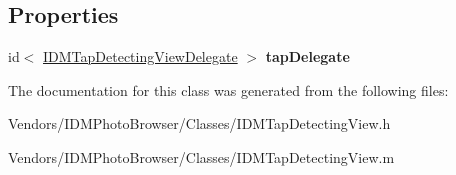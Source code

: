 \subsection*{Properties}
\begin{DoxyCompactItemize}
\item 
\hypertarget{interface_i_d_m_tap_detecting_view_acba8c473b6f85e2563a25062edb6b741}{}id$<$ \hyperlink{protocol_i_d_m_tap_detecting_view_delegate-p}{I\+D\+M\+Tap\+Detecting\+View\+Delegate} $>$ {\bfseries tap\+Delegate}\label{interface_i_d_m_tap_detecting_view_acba8c473b6f85e2563a25062edb6b741}

\end{DoxyCompactItemize}


The documentation for this class was generated from the following files\+:\begin{DoxyCompactItemize}
\item 
Vendors/\+I\+D\+M\+Photo\+Browser/\+Classes/I\+D\+M\+Tap\+Detecting\+View.\+h\item 
Vendors/\+I\+D\+M\+Photo\+Browser/\+Classes/I\+D\+M\+Tap\+Detecting\+View.\+m\end{DoxyCompactItemize}
